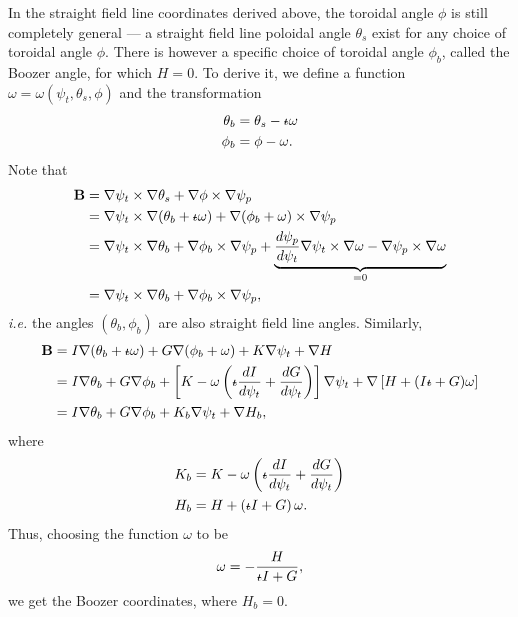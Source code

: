 In the straight field line coordinates derived above, the toroidal angle $\phi$ is still completely general --- a straight field line poloidal angle $\theta_s$ exist for any choice of toroidal angle $\phi$. There is however a specific choice of toroidal angle $\phi_b$, called the Boozer angle, for which $H=0$. To derive it, we define a function $\omega=\omega(\psi_t,\theta_s,\phi)$ and the transformation
\begin{align}
	\theta_b &= \theta_s -\text{$\iota\!\!$-}\omega\\
	\phi_b &= \phi - \omega.
\end{align}
Note that
\begin{align}
	\mathbf{B} &= \nabla\psi_t\times\nabla\theta_s + \nabla\phi\times\nabla\psi_p\\
	&= \nabla\psi_t\times\nabla(\theta_b+\text{$\iota\!\!$-}\omega) + \nabla(\phi_b+\omega)\times\nabla\psi_p\\
	&= \nabla\psi_t\times\nabla\theta_b + \nabla\phi_b\times\nabla\psi_p + \underbrace{\frac{d\psi_p}{d\psi_t}\nabla\psi_t\times\nabla\omega - \nabla\psi_p\times\nabla\omega}_{=0}\\
	&= \nabla\psi_t\times\nabla\theta_b + \nabla\phi_b\times\nabla\psi_p,
\end{align}
\textit{i.e.} the angles $(\theta_b,\phi_b)$ are also straight field line angles. Similarly, 
\begin{align}
	\mathbf{B} &= I\nabla(\theta_b+\text{$\iota\!\!$-}\omega) + G\nabla(\phi_b+\omega) + K \nabla\psi_t + \nabla H\\
	&= I\nabla\theta_b + G\nabla\phi_b + \left[K-\omega\left(\text{$\iota\!\!$-}\frac{dI}{d\psi_t}+\frac{dG}{d\psi_t}\right)\right]\nabla\psi_t + \nabla\left[H+(I\text{$\iota\!\!$-}+G)\omega\right]\\
	&= I\nabla\theta_b + G\nabla\phi_b + K_b\nabla\psi_t + \nabla H_b,
\end{align}
where 
\begin{align}
	K_b &= K-\omega\left(\text{$\iota\!\!$-}\frac{dI}{d\psi_t}+\frac{dG}{d\psi_t}\right)\\
	H_b &= H + \left(\text{$\iota\!\!$-} I + G\right) \omega.
\end{align}
Thus, choosing the function $\omega$ to be 
\begin{equation}
	\omega = -\frac{H}{\text{$\iota\!\!$-} I + G},
\end{equation}
we get the Boozer coordinates, where $H_b = 0$.






